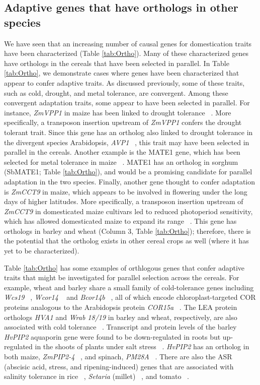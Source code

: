 \documentclass[12pt]{article}
\begin{document}
\subsection*{Adaptive genes that have orthologs in other species}
We have seen that an increasing number of causal genes for domestication traits have been characterized (Table \ref{tab:Ortho}). 
Many of these characterized genes have orthologs in the cereals that have been selected in parallel.   
In Table \ref{tab:Ortho}, we demonstrate cases where genes have been characterized that appear to confer adaptive traits. 
As discussed previously, some of these traits, such as cold, drought, and metal tolerance, are convergent. Among these convergent adaptation traits, some appear to have been selected in parallel. 
For instance, \textit{ZmVPP1} in maize has been linked to drought tolerance ~\citep{Wang2016}. More specifically, a transposon insertion upstream of \textit{ZmVPP1} confers the drought tolerant trait. 
Since this gene has an ortholog also linked to drought tolerance in the divergent species Arabidopsis, \textit{AVP1} ~\citep{Gaxiola2001}, this trait may have been selected in parallel in the cereals. 
Another example is the MATE1 gene, which has been selected for metal tolerance in maize ~\citep{Maron2013}.
MATE1 has an ortholog in sorghum (SbMATE1; Table \ref{tab:Ortho}), and would be a promising candidate for parallel adaptation in the two species. 
Finally, another gene thought to confer adaptation is \textit{ZmCCT9} in maize, which appears to be involved in flowering under the long days of higher latitudes.
More specifically, a transposon insertion upstream of \textit{ZmCCT9} in domesticated maize cultivars led to reduced photoperiod sensitivity, which has allowed domesticated maize to expand its range ~\citep{Huang2017}. 
This gene has orthologs in barley and wheat (Column 3, Table \ref{tab:Ortho}); therefore, there is the potential that the ortholog exists in other cereal crops as well (where it has yet to be characterized).

Table \ref{tab:Ortho} has some examples of orthlogous genes that confer adaptive traits that might be investigated for parallel selection across the cereals. For example, wheat and barley share a small family of cold-tolerance genes including \textit{Wcs19} ~\citep{pmid8219063}, \textit{Wcor14} ~\citep{pmid10846621} and \textit{Bcor14b} ~\citep{pmid9952464}, all of which encode chloroplast-targeted COR proteins analogous to the Arabidopsis protein \textit{COR15a}  ~\citep{pmid9826741, Takumi2003}.
The LEA protein orthologs \textit{HVA1} and \textit{Wrab 18/19} in barley and wheat, respectively, are also associated with cold tolerance ~\citep{Hong1988, pmid16755132}.
Transcript and protein levels of the barley \textit{HvPIP2} aquaporin gene were found to be down-regulated in roots but up-regulated in the shoots of plants under salt stress ~\citep{Katsuhara2002}.
\textit{HvPIP2} has an ortholog in both maize, \textit{ZmPIP2-4} ~\citep{Zhu2005}, and spinach, \textit{PM28A} ~\citep{Fotiadis2000}.
There are also the ASR (abscisic acid, stress, and ripening-induced) genes that are associated with salinity tolerance in rice ~\citep{Joo2013}, \textit{Setaria} (millet) ~\citep{Li2017}, and tomato ~\citep{Konrad2008}.  
\end{document}
